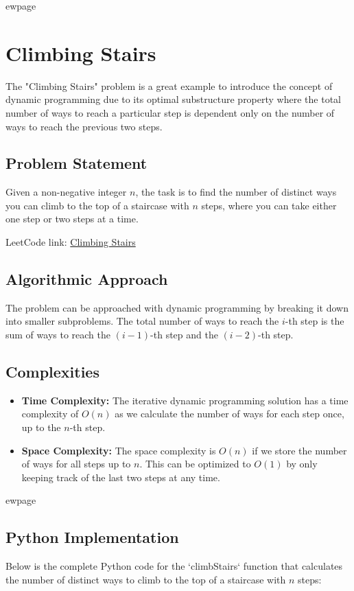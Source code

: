 
ewpage
\chapter{Climbing Stairs}
\label{chap:Climbing_Stairs}
The "Climbing Stairs" problem is a great example to introduce the concept of dynamic programming due to its optimal substructure property where the total number of ways to reach a particular step is dependent only on the number of ways to reach the previous two steps.

\section*{Problem Statement}
Given a non-negative integer \(n\), the task is to find the number of distinct ways you can climb to the top of a staircase with \(n\) steps, where you can take either one step or two steps at a time.

LeetCode link: \href{https://leetcode.com/problems/climbing-stairs/}{Climbing Stairs}

\section*{Algorithmic Approach}
The problem can be approached with dynamic programming by breaking it down into smaller subproblems. The total number of ways to reach the \(i\)-th step is the sum of ways to reach the \((i-1)\)-th step and the \((i-2)\)-th step.

\section*{Complexities}
\begin{itemize}
	\item \textbf{Time Complexity:} The iterative dynamic programming solution has a time complexity of \(O(n)\) as we calculate the number of ways for each step once, up to the \(n\)-th step.
	\item \textbf{Space Complexity:} The space complexity is \(O(n)\) if we store the number of ways for all steps up to \(n\). This can be optimized to \(O(1)\) by only keeping track of the last two steps at any time.
\end{itemize}


ewpage %
\section*{Python Implementation}
Below is the complete Python code for the `climbStairs` function that calculates the number of distinct ways to climb to the top of a staircase with \(n\) steps:

